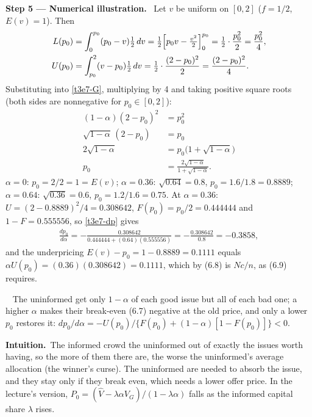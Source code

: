 \documentclass[11pt,a4paper]{article}
\newcommand{\step}[2]{\par\medskip\noindent\textbf{Step #1 --- #2.}~}
\newcommand{\intuition}{\par\medskip\noindent\textbf{Intuition.}~}
\newcommand{\answer}[1]{\par\smallskip\noindent\fbox{\textbf{Answer #1.}}~}
\begin{document}
\step{5}{Numerical illustration} Let $v$ be uniform on $[0,2]$ ($f=1/2$, $E(v)=1$). Then
\begin{align}
  L(p_0) &= \int_0^{p_0}(p_0-v)\tfrac12\,dv = \tfrac12\Bigl[p_0v-\tfrac{v^2}{2}\Bigr]_0^{p_0} = \tfrac12\cdot\frac{p_0^2}{2} = \frac{p_0^2}{4}, \nonumber\\
  U(p_0) &= \int_{p_0}^{2}(v-p_0)\tfrac12\,dv = \tfrac12\cdot\frac{(2-p_0)^2}{2} = \frac{(2-p_0)^2}{4}. \nonumber
\end{align}
Substituting into \eqref{t3e7-G}, multiplying by 4 and taking positive square roots (both sides are nonnegative for $p_0\in[0,2]$):
\begin{align}
  (1-\alpha)(2-p_0)^2 &= p_0^2 \nonumber\\
  \sqrt{1-\alpha}\,(2-p_0) &= p_0 \nonumber\\
  2\sqrt{1-\alpha} &= p_0\bigl(1+\sqrt{1-\alpha}\bigr) \nonumber\\
  p_0 &= \frac{2\sqrt{1-\alpha}}{1+\sqrt{1-\alpha}}. \nonumber
\end{align}
$\alpha=0$: $p_0=2/2=1=E(v)$; $\alpha=0.36$: $\sqrt{0.64}=0.8$, $p_0=1.6/1.8=0.8889$; $\alpha=0.64$: $\sqrt{0.36}=0.6$, $p_0=1.2/1.6=0.75$. At $\alpha=0.36$: $U=(2-0.8889)^2/4=0.308642$, $F(p_0)=p_0/2=0.444444$ and $1-F=0.555556$, so \eqref{t3e7-dp} gives
\begin{align}
  \frac{dp_0}{d\alpha} = -\frac{0.308642}{0.444444+(0.64)(0.555556)} = -\frac{0.308642}{0.8} = -0.3858, \nonumber
\end{align}
and the underpricing $E(v)-p_0=1-0.8889=0.1111$ equals $\alpha U(p_0)=(0.36)(0.308642)=0.1111$, which by (6.8) is $Nc/n$, as (6.9) requires.

\answer{(\#6)} The uninformed get only $1-\alpha$ of each good issue but all of each bad one; a higher $\alpha$ makes their break-even (6.7) negative at the old price, and only a lower $p_0$ restores it: $dp_0/d\alpha=-U(p_0)/\{F(p_0)+(1-\alpha)[1-F(p_0)]\}<0$.

\intuition The informed crowd the uninformed out of exactly the issues worth having, so the more of them there are, the worse the uninformed's average allocation (the winner's curse). The uninformed are needed to absorb the issue, and they stay only if they break even, which needs a lower offer price. In the lecture's version, $P_0=(\hat V-\lambda\alpha V_G)/(1-\lambda\alpha)$ falls as the informed capital share $\lambda$ rises.
\end{document}
